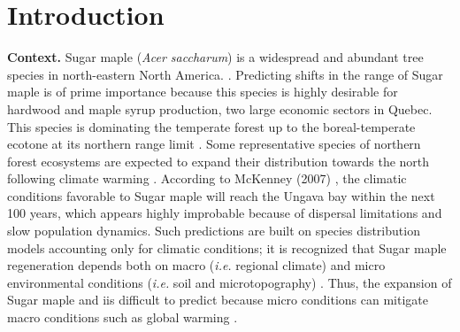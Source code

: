 


\newpage
\setcounter{page}{1}

\section{Introduction}

\textbf{Context.} Sugar maple (\textit{Acer saccharum}) is a widespread and
abundant tree species in north-eastern North America.
\cite{Graignic2013,Messaoud2007,Kellman2004,Barras1998}. Predicting shifts in
the range of Sugar maple is of prime importance because this species is
highly desirable for hardwood and maple syrup production, two large economic
sectors in Quebec. This species is dominating the temperate forest
up to the boreal-temperate ecotone at its northern range
limit \cite{Barras1998}. Some representative species of northern
forest ecosystems are expected to expand their distribution towards
the north following climate warming \cite{Sciences2014,Iverson2002}. According to McKenney (2007)
\cite{Sciences2014}, the climatic conditions  favorable to Sugar maple 
will reach the Ungava bay within the next 100 years, which appears highly improbable because of dispersal limitations and slow population dynamics.  Such
predictions are built on species distribution models accounting only for climatic
conditions; it is recognized that Sugar maple regeneration depends both on macro 
(\textit{i.e.} regional climate) and micro environmental conditions (\textit{i.e.} soil and
microtopography) \cite{Graignic2013,Lafleur2010}. Thus, the expansion of Sugar
maple and iis difficult to predict because
micro conditions can mitigate macro conditions such as global warming
\cite{DeFrenne2013}.\\

